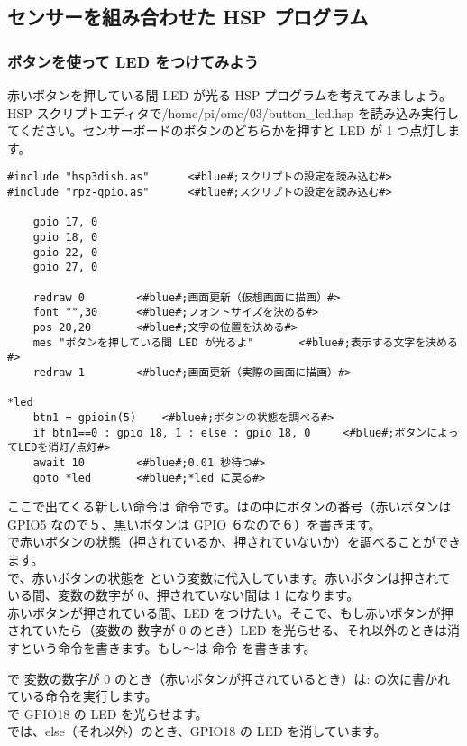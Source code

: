\subsection{センサーを組み合わせた HSP プログラム}
\subsubsection{ボタンを使って LED をつけてみよう}
赤いボタンを押している間 LED が光る HSP プログラムを考えてみましょう。HSP スクリプトエディタで/home/pi/ome/03/button\_led.hsp を読み込み実行してください。センサーボードのボタンのどちらかを押すと LED が 1 つ点灯します。\\

\begin{lstlisting}[caption=button\_led.hsp,label=button_led.hsp]
#include "hsp3dish.as"		<#blue#;スクリプトの設定を読み込む#>
#include "rpz-gpio.as"		<#blue#;スクリプトの設定を読み込む#>

	gpio 17, 0
	gpio 18, 0
	gpio 22, 0
	gpio 27, 0
   
	redraw 0		<#blue#;画面更新（仮想画面に描画）#>
	font "",30		<#blue#;フォントサイズを決める#>
	pos 20,20		<#blue#;文字の位置を決める#>
	mes "ボタンを押している間 LED が光るよ"		<#blue#;表示する文字を決める#>
	redraw 1		<#blue#;画面更新（実際の画面に描画）#>

*led
	btn1 = gpioin(5) 	<#blue#;ボタンの状態を調べる#>
	if btn1==0 : gpio 18, 1 : else : gpio 18, 0 	<#blue#;ボタンによってLEDを消灯/点灯#>
	await 10 		<#blue#;0.01 秒待つ#>
	goto *led 		<#blue#;*led に戻る#>
\end{lstlisting}

ここで出てくる新しい命令は  命令です。は\code{()}の中にボタンの番号（赤いボタンは
GPIO5 なので５、黒いボタンは GPIO ６なので６）を書きます。\\

で赤いボタンの状態（押されているか、押されていないか）を調べることができます。\\
で、赤いボタンの状態を  という変数に代入しています。赤いボタンは押されている間、変数の数字が 0、押されていない間は 1 になります。\\

赤いボタンが押されている間、LED をつけたい。そこで、もし赤いボタンが押されていたら（変数の
数字が 0 のとき）LED を光らせる、それ以外のときは消すという命令を書きます。もし～は  命令
を書きます。

 で  変数の数字が 0 のとき（赤いボタンが押されているとき）は\code{ }: の次に書かれている命令を実行します。\\
 で GPIO18 の LED を光らせます。\\
 では、else（それ以外）のとき、GPIO18 の LED を消しています。\\

